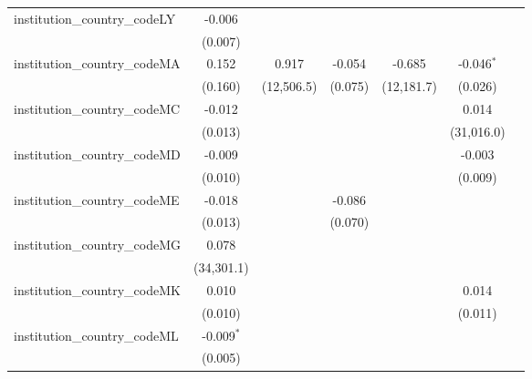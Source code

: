 \begin{tabular}{lcccccc}
   institution\_country\_codeLY          & -0.006         &               &               &               &               &   \\   
                                         & (0.007)        &               &               &               &               &   \\   
   institution\_country\_codeMA          & 0.152          & 0.917         & -0.054        & -0.685        & -0.046$^{*}$  &   \\   
                                         & (0.160)        & (12,506.5)    & (0.075)       & (12,181.7)    & (0.026)       &   \\   
   institution\_country\_codeMC          & -0.012         &               &               &               & 0.014         &   \\   
                                         & (0.013)        &               &               &               & (31,016.0)    &   \\   
   institution\_country\_codeMD          & -0.009         &               &               &               & -0.003        &   \\   
                                         & (0.010)        &               &               &               & (0.009)       &   \\   
   institution\_country\_codeME          & -0.018         &               & -0.086        &               &               &   \\   
                                         & (0.013)        &               & (0.070)       &               &               &   \\   
   institution\_country\_codeMG          & 0.078          &               &               &               &               &   \\   
                                         & (34,301.1)     &               &               &               &               &   \\   
   institution\_country\_codeMK          & 0.010          &               &               &               & 0.014         &   \\   
                                         & (0.010)        &               &               &               & (0.011)       &   \\   
   institution\_country\_codeML          & -0.009$^{*}$   &               &               &               &               &   \\   
                                         & (0.005)        &               &               &               &               &   \\   

\end{tabular}
